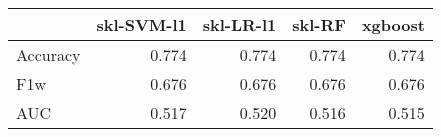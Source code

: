 \begin{tabular}{lrrrr}
\toprule
{} &  skl-SVM-l1 &  skl-LR-l1 &  skl-RF &  xgboost \\
\midrule
Accuracy &       0.774 &      0.774 &   0.774 &    0.774 \\
F1w      &       0.676 &      0.676 &   0.676 &    0.676 \\
AUC      &       0.517 &      0.520 &   0.516 &    0.515 \\
\bottomrule
\end{tabular}
